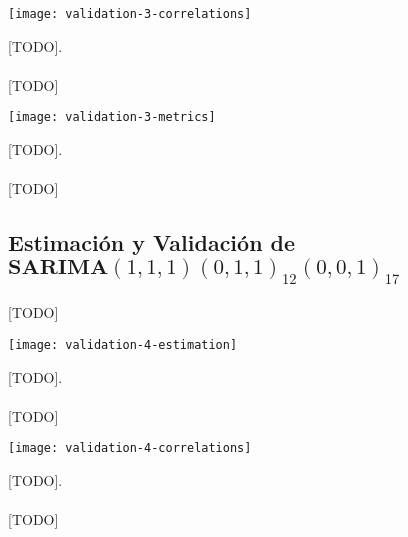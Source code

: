 \documentclass[a4paper, spanish]{article}
\begin{document}
      \begin{table}[htb!]
        \centering
        \texttt{[image: validation-3-correlations]}
        \caption{[TODO].}
        \label{}
      \end{table}

      \paragraph{}
      [TODO]

      \begin{table}[htb!]
        \centering
        \texttt{[image: validation-3-metrics]}
        \caption{[TODO].}
        \label{}
      \end{table}

      \paragraph{}
      [TODO]

    \subsection{Estimación y Validación de $\textbf{SARIMA}(1, 1, 1)(0, 1, 1)_{12}(0, 0, 1)_{17}$}
    \label{sec:fitting_4}

      \paragraph{}
      [TODO]

      \begin{table}[htb!]
        \centering
        \texttt{[image: validation-4-estimation]}
        \caption{[TODO].}
        \label{}
      \end{table}

      \paragraph{}
      [TODO]

      \begin{table}[htb!]
        \centering
        \texttt{[image: validation-4-correlations]}
        \caption{[TODO].}
        \label{}
      \end{table}

      \paragraph{}
      [TODO]
\end{document}
